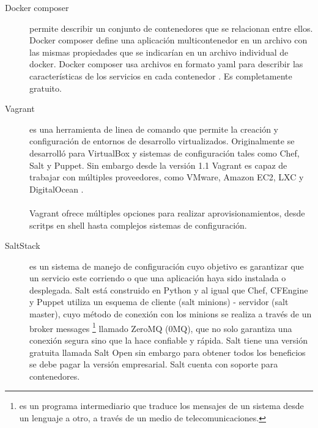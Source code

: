 \documentclass[conference, spanish]{IEEEtran}
\begin{document}
\begin{description}
\item [Docker composer]
permite describir un conjunto de contenedores que se relacionan entre ellos. Docker composer define una aplicación multicontenedor en un archivo con las mismas propiedades que se indicarían en un archivo individual de docker. Docker composer usa archivos en formato yaml para describir las características de los servicios en cada contenedor \cite{doccom16}. Es completamente gratuito. 

\item [Vagrant]
 es una herramienta de linea de comando que permite la creación y configuración de entornos de desarrollo virtualizados. Originalmente se desarrolló para VirtualBox y sistemas de configuración tales como Chef, Salt y Puppet. Sin embargo desde la versión 1.1 Vagrant es capaz de trabajar con múltiples proveedores, como VMware, Amazon EC2, LXC y DigitalOcean \cite{Vag15}.\\
\\
Vagrant ofrece múltiples opciones para realizar aprovisionamientos, desde scritps en shell hasta complejos sistemas de configuración.

\item [SaltStack]
 es un sistema de manejo de configuración cuyo objetivo es garantizar que un servicio este corriendo o que una aplicación haya sido instalada o desplegada. Salt está construido en Python y al igual que Chef, CFEngine y Puppet utiliza un esquema de cliente (salt minions) - servidor (salt master), cuyo método de conexión con los minions se realiza a través de un broker messages \footnote{es un programa intermediario que traduce los mensajes de un sistema desde un lenguaje a otro, a través de un medio de telecomunicaciones.} llamado ZeroMQ (0MQ), que no solo garantiza una conexión segura sino que la hace confiable y rápida. Salt tiene una versión gratuita llamada Salt Open sin embargo para obtener todos los beneficios se debe pagar la versión empresarial. Salt cuenta con soporte para contenedores. \cite{Salt15}

\end{description}


%
%
\end{document}
